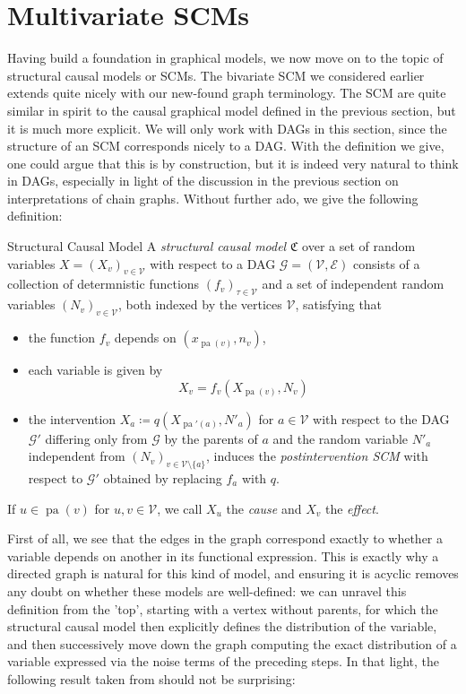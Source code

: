 \documentclass[11pt, a4paper]{memoir}
\theoremstyle{break}
\theoremstyle{break}
\theoremstyle{nonumberplain}
\DeclareMathOperator{\pa}{pa}
\begin{document}
\section{Multivariate SCMs}\label{multiSCM}
Having build a foundation in graphical models, we now move on to the topic of structural causal models or SCMs. The bivariate SCM we considered earlier extends quite nicely with our new-found graph terminology. The SCM are quite similar in spirit to the causal graphical model defined in the previous section, but it is much more explicit. We will only work with DAGs in this section, since the structure of an SCM corresponds nicely to a DAG. With the definition we give, one could argue that this is by construction, but it is indeed very natural to think in DAGs, especially in light of the discussion in the previous section on interpretations of chain graphs. Without further ado, we give the following definition:
\begin{mydefinition}{Structural Causal Model}
A \emph{structural causal model} $\mathfrak{C}$ over a set of random variables $X=(X_v)_{v\in \mathcal{V}}$ with respect to a DAG $\mathcal{G}=(\mathcal{V},\mathcal{E})$ consists of a collection of determnistic functions $(f_v)_{\tau\in \mathcal{V}}$ and a set of independent random variables $(N_v)_{v\in \mathcal{V}}$, both indexed by the vertices $\mathcal{V}$, satisfying that
\begin{itemize}
	\item the function $f_v$ depends on $\left(x_{\pa(v)}, n_v\right)$,
	\item each variable is given by
	$$X_v=f_v\left(X_{\pa(v)}, N_v\right)$$
	\item the intervention $X_a\coloneqq q\left(X_{\pa'(a)}, N'_a\right)$ for $a\in \mathcal{V}$ with respect to the DAG $\mathcal{G}'$ differing only from $\mathcal{G}$ by the parents of $a$ and the random variable $N'_a$ independent from $(N_v)_{v\in \mathcal{V}\setminus \{a\}}$, induces the \emph{postintervention SCM} with respect to $\mathcal{G}'$ obtained by replacing $f_a$ with $q$.
\end{itemize}
If $u\in \pa(v)$ for $u,v\in \mathcal{V}$, we call $X_u$ the \emph{cause} and $X_v$ the \emph{effect}. 
\end{mydefinition}
First of all, we see that the edges in the graph correspond exactly to whether a variable depends on another in its functional expression. This is exactly why a directed graph is natural for this kind of model, and ensuring it is acyclic removes any doubt on whether these models are well-defined: we can unravel this definition from the 'top', starting with a vertex without parents, for which the structural causal model then explicitly defines the distribution of the variable, and then successively move down the graph computing the exact distribution of a variable expressed via the noise terms of the preceding steps. In that light, the following result taken from \cite{Pearl} should not be surprising:
\end{document}
